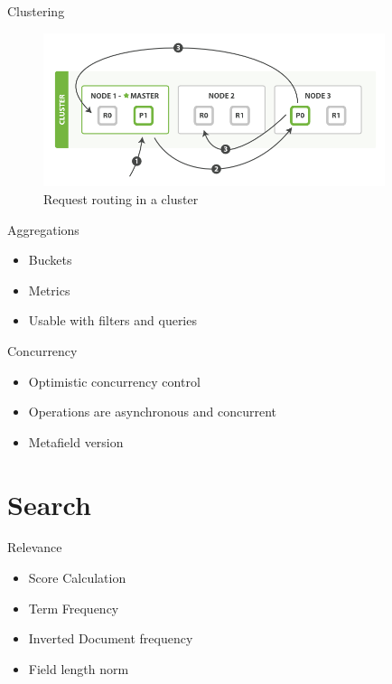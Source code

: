 \documentclass[10pt]{beamer}
\begin{document}
\begin{frame}{Clustering}
	\begin{figure}
		\centering\includegraphics[width=10cm]{cluster_data}
		\caption{Request routing in a cluster}
	\end{figure}
\end{frame}



\begin{frame}{Aggregations}
	\begin{itemize}
		\item Buckets
		\item Metrics
		\item Usable with filters and queries
	\end{itemize}
\end{frame}

\begin{frame}{Concurrency}
	\begin{itemize}
		\item Optimistic concurrency control
		\item Operations are asynchronous and concurrent
		\item Metafield version
	\end{itemize}
\end{frame}


\section{Search}
\begin{frame}{Relevance}
	\begin{itemize}
		\item Score Calculation
		\item Term Frequency
		\item Inverted Document frequency
		\item Field length norm
	\end{itemize}
\end{frame}
\end{document}
